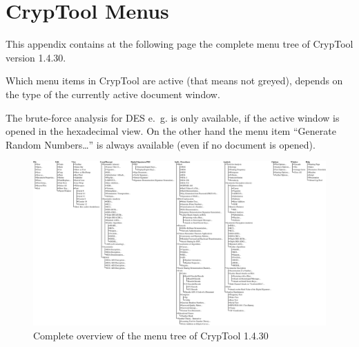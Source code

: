 
\newpage
\enlargethispage{1cm}
\hypertarget{appendix-menutree}{}
\section{CrypTool Menus}
\label{s:appendix-menutree}

This appendix contains at the following page the complete menu tree of
CrypTool version 1.4.30. 

Which menu items in CrypTool are active (that means not greyed), depends on
the type of the currently active document window.

The brute-force analysis for DES e.~g. is only
available, if the active window is opened in the hexadecimal view. 
On the other hand the menu item ``Generate Random Numbers\dots''
is always available (even if no document is opened).



\clearpage
\begin{figure}[hb]
\begin{center}
\vspace{-30pt}
\includegraphics[scale=0.25, angle=270]
                {figures/cryptool-menu-en}
\caption{Complete overview of the menu tree of CrypTool 1.4.30} 
\label{menuoverview}
\end{center}
\end{figure}
\clearpage
